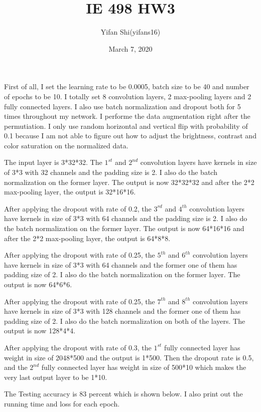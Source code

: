 \documentclass{article}
\title{IE 498 HW3}
\author{Yifan Shi(yifans16)}
\date{March 7, 2020}
\begin{document}
\maketitle


First of all, I set the learning rate to be 0.0005, batch size 
to be 40 and number of epochs to be 10. I totally set 8 
convolution layers, 2 max-pooling layers and 2 fully connected 
layers. I also use batch normalization and dropout both for 5 
times throughout my network. I performe the data augmentation 
right after the permutiation. I only use random horizontal and 
vertical flip with probability of 0.1 because I am not able to 
figure out how to adjust the brightness, contrast and color 
saturation on the normalized data. 


The input layer is 3*32*32. The $1^{st}$ and $2^{nd}$ convolution 
layers have kernels in size of 3*3 with 32 channels and the padding 
size is 2. I also do the batch normalization on the former layer. 
The output is now 32*32*32 and after the 2*2 max-pooling layer, 
the output is 32*16*16. 


After applying the dropout with rate of 0.2, the $3^{rd}$ 
and $4^{th}$ convolution layers have kernels in size of 3*3 with 
64 channels and the padding size is 2. I also do the batch 
normalization on the former layer. The output is now 64*16*16 
and after the 2*2 max-pooling layer, the output is 64*8*8. 


After applying the dropout with rate of 0.25, the $5^{th}$ and $6^{th}$ 
convolution layers have kernels in size of 3*3 with 64 channels 
and the former one of them has padding size of 2. I also do the batch 
normalization on the former layer. The output is now 64*6*6.


After applying the dropout with rate of 0.25, the $7^{th}$ and $8^{th}$ 
convolution layers have kernels in size of 3*3 with 128 channels 
and the former one of them has padding size of 2. I also do the batch 
normalization on both of the layers. The output is now 128*4*4.


After applying the dropout with rate of 0.3, the $1^{st}$ fully 
connected layer has weight in size of 2048*500 and the output is 
1*500. Then the dropout rate is 0.5, and the $2^{nd}$ fully connected 
layer has weight in size of 500*10 which makes the very last output 
layer to be 1*10.


The Testing accuracy is 83 percent which is shown below. I also 
print out the running time and loss for each epoch. 


\newpage
\end{document}
